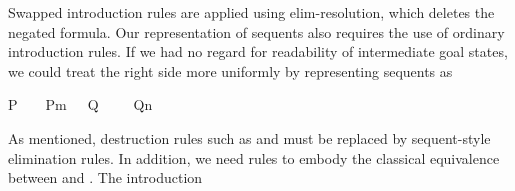 \begin{isabellebody}
\begin{isamarkuptext}
  Swapped introduction rules are applied using elim-resolution, which
  deletes the negated formula.  Our representation of sequents also
  requires the use of ordinary introduction rules.  If we had no
  regard for readability of intermediate goal states, we could treat
  the right side more uniformly by representing sequents as \begin{isabelle}%
{}P\ {}\ {}\ {}\ P\isactrlsub m\ {}\ {}\ Q\ {}\ {}\ {}\ {}\ Q\isactrlsub n\ {}\ {}{}%
\end{isabelle}%
\end{isamarkuptext}%
\isamarkuptrue%
%
\isamarkuptrue%
%
\begin{isamarkuptext}%
As mentioned, destruction rules such as  and
   must be replaced by sequent-style elimination rules.
  In addition, we need rules to embody the classical equivalence
  between  and .  The introduction

\end{isamarkuptext}
\end{isabellebody}
